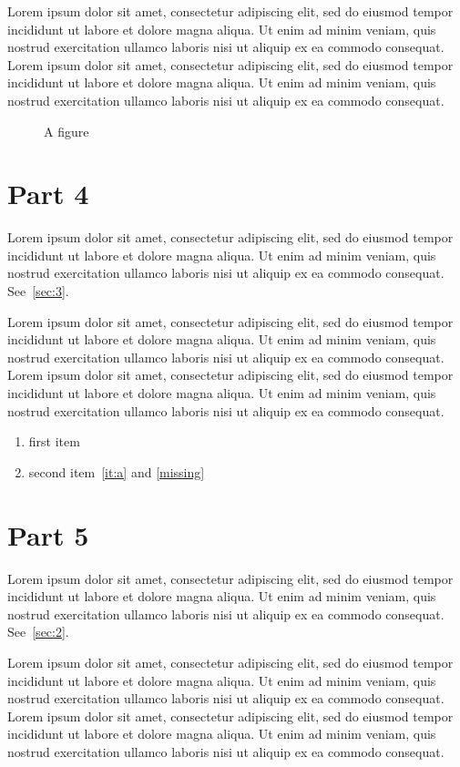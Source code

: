 \documentclass{article}
\begin{document}
Lorem ipsum dolor sit amet, consectetur adipiscing elit, sed do eiusmod tempor incididunt ut labore et dolore magna aliqua. Ut enim ad minim veniam, quis nostrud exercitation ullamco laboris nisi ut aliquip ex ea commodo consequat. Lorem ipsum dolor sit amet, consectetur adipiscing elit, sed do eiusmod tempor incididunt ut labore et dolore magna aliqua. Ut enim ad minim veniam, quis nostrud exercitation ullamco laboris nisi ut aliquip ex ea commodo consequat.

\begin{figure}[t]
\centering
\caption{A figure}\label{fig:a}
\end{figure}

\section{Part 4}\label{sec:4}
Lorem ipsum dolor sit amet, consectetur adipiscing elit, sed do eiusmod tempor incididunt ut labore et dolore magna aliqua. Ut enim ad minim veniam, quis nostrud exercitation ullamco laboris nisi ut aliquip ex ea commodo consequat. See~\ref{sec:3}.

Lorem ipsum dolor sit amet, consectetur adipiscing elit, sed do eiusmod tempor incididunt ut labore et dolore magna aliqua. Ut enim ad minim veniam, quis nostrud exercitation ullamco laboris nisi ut aliquip ex ea commodo consequat. Lorem ipsum dolor sit amet, consectetur adipiscing elit, sed do eiusmod tempor incididunt ut labore et dolore magna aliqua. Ut enim ad minim veniam, quis nostrud exercitation ullamco laboris nisi ut aliquip ex ea commodo consequat.

\begin{enumerate}
\item first\label{it:a} item
\item second \label{it:b}item~\ref{it:a} and \ref{missing}
\end{enumerate}

\section{Part 5}\label{sec:5}
Lorem ipsum dolor sit amet, consectetur adipiscing elit, sed do eiusmod tempor incididunt ut labore et dolore magna aliqua. Ut enim ad minim veniam, quis nostrud exercitation ullamco laboris nisi ut aliquip ex ea commodo consequat. See~\ref{sec:2}.

Lorem ipsum dolor sit amet, consectetur adipiscing elit, sed do eiusmod tempor incididunt ut labore et dolore magna aliqua. Ut enim ad minim veniam, quis nostrud exercitation ullamco laboris nisi ut aliquip ex ea commodo consequat. Lorem ipsum dolor sit amet, consectetur adipiscing elit, sed do eiusmod tempor incididunt ut labore et dolore magna aliqua. Ut enim ad minim veniam, quis nostrud exercitation ullamco laboris nisi ut aliquip ex ea commodo consequat.
\end{document}

